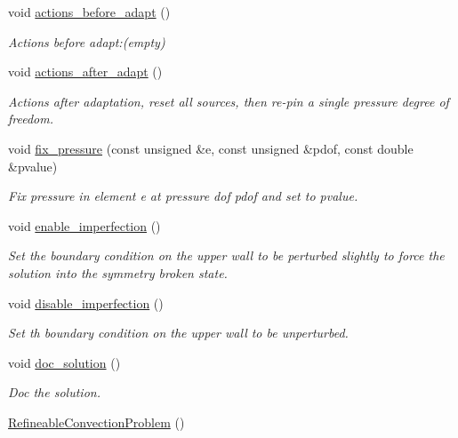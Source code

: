 \begin{DoxyCompactItemize}
void \hyperlink{classRefineableConvectionProblem_a962499683ada1233e20055e46b15fdb0}{actions\+\_\+before\+\_\+adapt} ()
\begin{DoxyCompactList}\small\item\em Actions before adapt\+:(empty) \end{DoxyCompactList}\item 
void \hyperlink{classRefineableConvectionProblem_a9baa484155212df5ad2137dd5a348def}{actions\+\_\+after\+\_\+adapt} ()
\begin{DoxyCompactList}\small\item\em Actions after adaptation, reset all sources, then re-\/pin a single pressure degree of freedom. \end{DoxyCompactList}\item 
void \hyperlink{classRefineableConvectionProblem_a3432fe8f8e4ba54d5e4c1ca7b3b233e2}{fix\+\_\+pressure} (const unsigned \&e, const unsigned \&pdof, const double \&pvalue)
\begin{DoxyCompactList}\small\item\em Fix pressure in element e at pressure dof pdof and set to pvalue. \end{DoxyCompactList}\item 
void \hyperlink{classRefineableConvectionProblem_aa97926281f88014ad45f43972184a77c}{enable\+\_\+imperfection} ()
\begin{DoxyCompactList}\small\item\em Set the boundary condition on the upper wall to be perturbed slightly to force the solution into the symmetry broken state. \end{DoxyCompactList}\item 
void \hyperlink{classRefineableConvectionProblem_a816f49163ff3ceb71aec4236aac10d84}{disable\+\_\+imperfection} ()
\begin{DoxyCompactList}\small\item\em Set th boundary condition on the upper wall to be unperturbed. \end{DoxyCompactList}\item 
void \hyperlink{classRefineableConvectionProblem_a47efcb3467931e13e12687303135e38b}{doc\+\_\+solution} ()
\begin{DoxyCompactList}\small\item\em Doc the solution. \end{DoxyCompactList}\item 
\hyperlink{classRefineableConvectionProblem_aa3a0c85ea1db9186292d130a3ec23a2d}{Refineable\+Convection\+Problem} ()

\end{DoxyCompactItemize}
